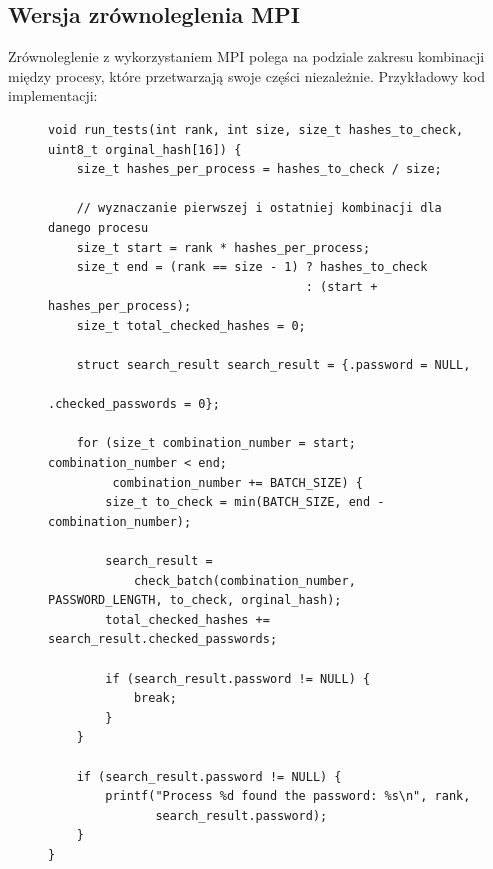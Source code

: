 \documentclass[a4paper,12pt]{article}
\begin{document}
\subsection{Wersja zrównoleglenia MPI}
Zrównoleglenie z wykorzystaniem MPI polega na podziale zakresu kombinacji między procesy, które przetwarzają swoje części niezależnie. Przykładowy kod implementacji:
\begin{figure}[H]
\begin{lstlisting}
void run_tests(int rank, int size, size_t hashes_to_check, uint8_t orginal_hash[16]) {
    size_t hashes_per_process = hashes_to_check / size;

    // wyznaczanie pierwszej i ostatniej kombinacji dla danego procesu
    size_t start = rank * hashes_per_process;
    size_t end = (rank == size - 1) ? hashes_to_check
                                    : (start + hashes_per_process);
    size_t total_checked_hashes = 0;

    struct search_result search_result = {.password = NULL,
                                          .checked_passwords = 0};

    for (size_t combination_number = start; combination_number < end;
         combination_number += BATCH_SIZE) {
        size_t to_check = min(BATCH_SIZE, end - combination_number);

        search_result =
            check_batch(combination_number, PASSWORD_LENGTH, to_check, orginal_hash);
        total_checked_hashes += search_result.checked_passwords;

        if (search_result.password != NULL) {
            break;
        }
    }

    if (search_result.password != NULL) {
        printf("Process %d found the password: %s\n", rank,
               search_result.password);
    }
}
\end{lstlisting}
\end{figure}

\newpage
\end{document}
